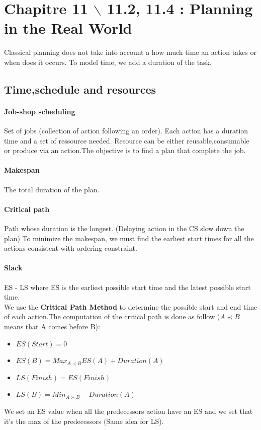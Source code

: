 \section{Chapitre 11 $\backslash$ 11.2, 11.4 : Planning in the Real World}
Classical planning does not take into account a how much time an action takes or when does it occurs. To 
model time, we add a duration of the task.
\subsection{Time,schedule and resources}
\paragraph{Job-shop scheduling} Set of jobs (collection of action following an order). Each action has a 
duration time and a set of ressource needed. Resource can be either reusable,consumable or produce via an 
action.The objective is to find a plan that complete the job.
\paragraph{Makespan} The total duration of the plan.
\paragraph{Critical path} Path whose duration is the longest. (Delaying action in the CS slow down the plan)
To minimize the makespan, we must find the earliest start times for all the actions consistent with ordering 
constraint.
\paragraph{Slack} ES - LS where ES is the earliest possible start time and the latest possible start time.\\
We use the \textbf{Critical Path Method} to determine the possible start and end time of each 
action.The computation of the critical path is done as follow ($A\prec B$ means that A comes before B):
	\begin{itemize}
		\item $ES(Start) = 0$
		\item $ES(B)=Max_{A\prec B}ES(A)+Duration(A)$
		\item $LS(Finish)=ES(Finish)$
		\item $LS(B)=Min_{A\succ B}-Duration(A)$
	\end{itemize}
We set an ES value when all the predecessors action have an ES and we set that it's the max of the 
predecessors (Same idea for LS). 
